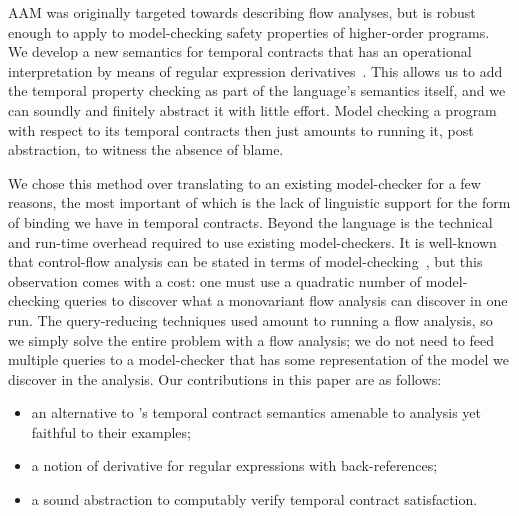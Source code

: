 AAM was originally targeted towards describing flow analyses, but is robust enough to apply to model-checking safety properties of higher-order programs.
%
We develop a new semantics for temporal contracts that has an operational interpretation by means of regular expression derivatives~\citep{ianjohnson:Brzozowski1964}.
%
This allows us to add the temporal property checking as part of the language's semantics itself, and we can soundly and finitely abstract it with little effort.
%
Model checking a program with respect to its temporal contracts then just amounts to running it, post abstraction, to witness the absence of blame.

We chose this method over translating to an existing model-checker for a few reasons, the most important of which is the lack of linguistic support for the form of binding we have in temporal contracts.
%
Beyond the language is the technical and run-time overhead required to use existing model-checkers.
%
It is well-known that control-flow analysis can be stated in terms of model-checking~\citep{ianjohnson:analysis-is-mc}, but this observation comes with a cost: one must use a quadratic number of model-checking queries to discover what a monovariant flow analysis can discover in one run.
%
The query-reducing techniques used amount to running a flow analysis, so we simply solve the entire problem with a flow analysis; we do not need to feed multiple queries to a model-checker that has some representation of the model we discover in the analysis.
%
Our contributions in this paper are as follows:
\begin{itemize}
 \item{an alternative to \dfm's temporal contract semantics amenable to analysis yet faithful to their examples;}
 \item{a notion of derivative for regular expressions with back-references;}
 \item{a sound abstraction to computably verify temporal contract satisfaction.}
\end{itemize}

